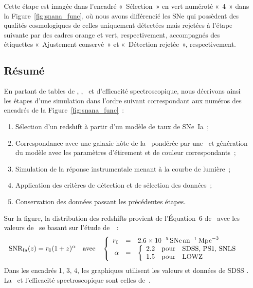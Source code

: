 \documentclass[../main/main.tex]{subfiles}
\begin{document}
Cette étape est imagée dans l'encadré «~Sélection~» en vert numéroté «~4~» dans
la Figure~\ref{fig:snana_func}, où nous avons différencié les SNe qui possèdent
des qualités cosmologiques de celles uniquement détectées
mais rejetées à l'étape suivante par des cadres orange et vert, respectivement,
accompagnés des étiquettes «~Ajustement conservé~» et «~Détection rejetée~»,
respectivement.

\subsection{Résumé}\label{ssec:simshort}

En partant de tables de \hostlib, \simlib, \wgtmap\ et d'efficacité
spectroscopique, nous décrivons ainsi les étapes d'une simulation dans l'ordre
suivant correspondant aux numéros des encadrés de la
Figure~\ref{fig:snana_func}~:
\begin{enumerate}
    \item Sélection d'un redshift à partir d'un modèle de taux de SNe~Ia~;
    \item Correspondance avec une galaxie hôte de la \hostlib\ pondérée par une
        \wgtmap\ et génération du modèle avec les paramètres d'étirement et de
        couleur correspondants~;
    \item Simulation de la réponse instrumentale menant à la courbe de lumière~;
    \item Application des critères de détection et de sélection des données~;
    \item Conservation des données passant les précédentes étapes.
\end{enumerate}
Sur la figure, la distribution des redshifts provient de l'Équation~6
de~\cite{perrett2012} avec les valeurs de~\cite{popovic2021a} se basant sur
l'étude de~\cite{scolnic2018}~:
\begin{equation}
    \mathrm{SNR}_{\rm Ia}(z) = r_0(1+z)^{\alpha}\quad\text{avec}\quad \left\{
        \begin{array}{rcl}
            r_0 & = & \SI{2.6e-5}{SNe.an^{-1}.Mpc^{-3}} \\
            \alpha & = &
            \left\{
                \begin{array}{rcl}
                    \num{2.2} & \text{pour} & \text{SDSS, PS1, SNLS}\\
                    \num{1.5} & \text{pour} & \text{LOWZ}
                \end{array}
            \right.
        \end{array}
    \right.
\end{equation}
Dans les encadrés 1, 3, 4, les graphiques utilisent les valeurs et données de
SDSS \citep{sako2018}. La \wgtmap\ et l'efficacité spectroscopique sont celles
de~\cite{popovic2021a}.
\end{document}
